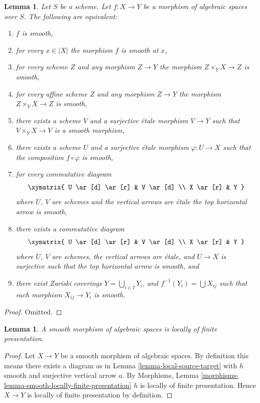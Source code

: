 \documentclass{stacks-project}
\theoremstyle{plain}
\newtheorem{lemma}[subsection]{Lemma}
\theoremstyle{definition}
\theoremstyle{remark}
\numberwithin{equation}{subsection}
\begin{document}
\begin{lemma}
\label{lemma-smooth-local}
Let $S$ be a scheme.
Let $f : X \to Y$ be a morphism of algebraic spaces over $S$.
The following are equivalent:
\begin{enumerate}
\item $f$ is smooth,
\item for every $x \in |X|$ the morphism $f$ is smooth at $x$,
\item for every scheme $Z$ and any morphism $Z \to Y$ the morphism
$Z \times_Y X \to Z$ is smooth,
\item for every affine scheme $Z$ and any morphism
$Z \to Y$ the morphism $Z \times_Y X \to Z$ is smooth,
\item there exists a scheme $V$ and a surjective \'etale morphism
$V \to Y$ such that $V \times_Y X \to V$ is a smooth morphism,
\item there exists a scheme $U$ and a surjective \'etale morphism
$\varphi : U \to X$ such that the composition $f \circ \varphi$
is smooth,
\item for every commutative diagram
$$
\xymatrix{
U \ar[d] \ar[r] & V \ar[d] \\
X \ar[r] & Y
}
$$
where $U$, $V$ are schemes and the vertical arrows are \'etale
the top horizontal arrow is smooth,
\item there exists a commutative diagram
$$
\xymatrix{
U \ar[d] \ar[r] & V \ar[d] \\
X \ar[r] & Y
}
$$
where $U$, $V$ are schemes, the vertical arrows are \'etale, and $U \to X$ is
surjective such that the top horizontal arrow is smooth, and
\item there exist Zariski coverings $Y = \bigcup_{i \in I} Y_i$,
and $f^{-1}(Y_i) = \bigcup X_{ij}$ such that
each morphism $X_{ij} \to Y_i$ is smooth.
\end{enumerate}
\end{lemma}

\begin{proof}
Omitted.
\end{proof}

\begin{lemma}
\label{lemma-smooth-locally-finite-presentation}
A smooth morphism of algebraic spaces is locally of finite presentation.
\end{lemma}

\begin{proof}
Let $X \to Y$ be a smooth morphism of algebraic spaces. By
definition this means there exists a diagram as in
Lemma \ref{lemma-local-source-target}
with $h$ smooth and surjective vertical arrow $a$. By
Morphisms, Lemma \ref{morphisms-lemma-smooth-locally-finite-presentation}
$h$ is locally of finite presentation. Hence $X \to Y$ is
locally of finite presentation by definition.
\end{proof}
\end{document}
